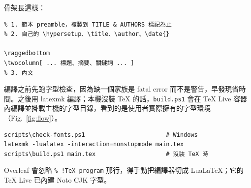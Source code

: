 骨架長這樣：
\begin{Verbatim}
% 1. 範本 preamble，複製到 TITLE & AUTHORS 標記為止
% 2. 自己的 \hypersetup、\title、\author、\date{}

\raggedbottom
\twocolumn[ ... 標題、摘要、關鍵詞 ... ]
% 3. 內文

\end{Verbatim}

編譯之前先跑字型檢查，因為缺一個家族是 fatal error 而不是警告，早發現省時間。之後用 latexmk 編譯；本機沒裝 TeX 的話，\texttt{build.ps1} 會在 TeX Live 容器內編譯並掛載主機的字型目錄，看到的是使用者實際擁有的字型環境（Fig.~\ref{fig:flow}）。
\begin{Verbatim}
scripts\check-fonts.ps1                       # Windows
latexmk -lualatex -interaction=nonstopmode main.tex
scripts\build.ps1 main.tex                    # 沒裝 TeX 時
\end{Verbatim}
Overleaf 會忽略 \texttt{\% !TeX program} 那行，得手動把編譯器切成 LuaLaTeX；它的 TeX Live 已內建 Noto CJK 字型。

